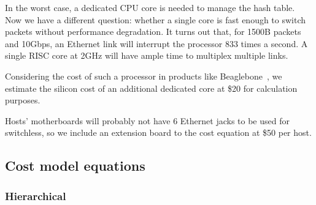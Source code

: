 In the worst case, a dedicated CPU core is needed to manage the hash table. Now we have a different question: whether a single core is fast enough to switch packets without performance degradation. It turns out that, for 1500B packets and 10Gbps, an Ethernet link will interrupt the processor 833 times a second. A single RISC core at 2GHz will have ample time to multiplex multiple links.

Considering the cost of such a processor in products like Beaglebone~\cite{FIXME}, we estimate the silicon cost of an additional dedicated core at \$20 for calculation purposes.

Hosts' motherboards will probably not have 6 Ethernet jacks to be used for switchless, so we include an extension board to the cost equation at \$50 per host.

\subsection{Cost model equations}
\subsubsection{Hierarchical}

